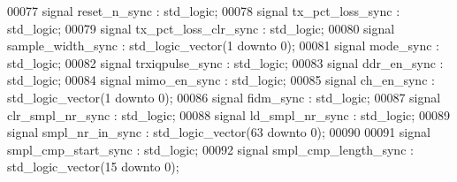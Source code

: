 \begin{DoxyCode}
00077 \textcolor{keywordflow}{signal} \textcolor{vhdlchar}{reset_n_sync}           \textcolor{vhdlchar}{:} \textcolor{comment}{std\_logic};
00078 \textcolor{keywordflow}{signal} \textcolor{vhdlchar}{tx_pct_loss_sync}       \textcolor{vhdlchar}{:} \textcolor{comment}{std\_logic};
00079 \textcolor{keywordflow}{signal} \textcolor{vhdlchar}{tx_pct_loss_clr_sync}   \textcolor{vhdlchar}{:} \textcolor{comment}{std\_logic};
00080 \textcolor{keywordflow}{signal} \textcolor{vhdlchar}{sample_width_sync}      \textcolor{vhdlchar}{:} \textcolor{comment}{std\_logic\_vector}\textcolor{vhdlchar}{(}\textcolor{vhdllogic}{}\textcolor{vhdllogic}{1} \textcolor{keywordflow}{downto} \textcolor{vhdllogic}{}\textcolor{vhdllogic}{0}\textcolor{vhdlchar}{)}; 
00081 \textcolor{keywordflow}{signal} \textcolor{vhdlchar}{mode_sync}              \textcolor{vhdlchar}{:} \textcolor{comment}{std\_logic};
00082 \textcolor{keywordflow}{signal} \textcolor{vhdlchar}{trxiqpulse_sync}        \textcolor{vhdlchar}{:} \textcolor{comment}{std\_logic}; 
00083 \textcolor{keywordflow}{signal} \textcolor{vhdlchar}{ddr_en_sync}            \textcolor{vhdlchar}{:} \textcolor{comment}{std\_logic}; 
00084 \textcolor{keywordflow}{signal} \textcolor{vhdlchar}{mimo_en_sync}           \textcolor{vhdlchar}{:} \textcolor{comment}{std\_logic};
00085 \textcolor{keywordflow}{signal} \textcolor{vhdlchar}{ch_en_sync}             \textcolor{vhdlchar}{:} \textcolor{comment}{std\_logic\_vector}\textcolor{vhdlchar}{(}\textcolor{vhdllogic}{}\textcolor{vhdllogic}{1} \textcolor{keywordflow}{downto} \textcolor{vhdllogic}{}\textcolor{vhdllogic}{0}\textcolor{vhdlchar}{)};
00086 \textcolor{keywordflow}{signal} \textcolor{vhdlchar}{fidm_sync}              \textcolor{vhdlchar}{:} \textcolor{comment}{std\_logic};
00087 \textcolor{keywordflow}{signal} \textcolor{vhdlchar}{clr_smpl_nr_sync}       \textcolor{vhdlchar}{:} \textcolor{comment}{std\_logic};
00088 \textcolor{keywordflow}{signal} \textcolor{vhdlchar}{ld_smpl_nr_sync}        \textcolor{vhdlchar}{:} \textcolor{comment}{std\_logic};
00089 \textcolor{keywordflow}{signal} \textcolor{vhdlchar}{smpl_nr_in_sync}        \textcolor{vhdlchar}{:} \textcolor{comment}{std\_logic\_vector}\textcolor{vhdlchar}{(}\textcolor{vhdllogic}{}\textcolor{vhdllogic}{63} \textcolor{keywordflow}{downto} \textcolor{vhdllogic}{}\textcolor{vhdllogic}{0}\textcolor{vhdlchar}{)};  
00090 
00091 \textcolor{keywordflow}{signal} \textcolor{vhdlchar}{smpl_cmp_start_sync}    \textcolor{vhdlchar}{:} \textcolor{comment}{std\_logic};
00092 \textcolor{keywordflow}{signal} \textcolor{vhdlchar}{smpl_cmp_length_sync}   \textcolor{vhdlchar}{:} \textcolor{comment}{std\_logic\_vector}\textcolor{vhdlchar}{(}\textcolor{vhdllogic}{}\textcolor{vhdllogic}{15} \textcolor{keywordflow}{downto} \textcolor{vhdllogic}{}\textcolor{vhdllogic}{0}\textcolor{vhdlchar}{)};

\end{DoxyCode}
